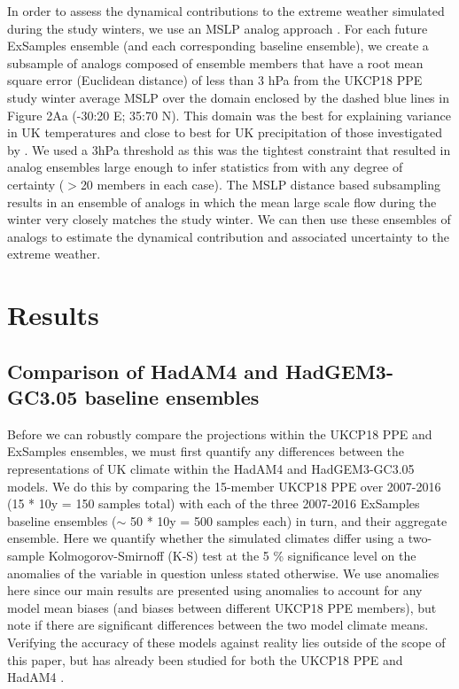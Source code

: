       In order to assess the dynamical contributions to the extreme weather simulated during the study winters, we use an MSLP analog approach \citep{cattiaux_winter_2010,vautard_attribution_2016,yiou_statistical_2017}. For each future ExSamples ensemble (and each corresponding baseline ensemble), we create a subsample of analogs composed of ensemble members that have a root mean square error (Euclidean distance) of less than 3 hPa from the UKCP18 PPE study winter average MSLP over the domain enclosed by the dashed blue lines in Figure 2Aa (-30:20\textdegree{} E; 35:70\textdegree{} N). This domain was the best for explaining variance in UK temperatures and close to best for UK precipitation of those investigated by \citep{neal_flexible_2016}. We used a 3hPa threshold as this was the tightest constraint that resulted in analog ensembles large enough to infer statistics from with any degree of certainty ($>$20 members in each case). The MSLP distance based subsampling results in an ensemble of analogs in which the mean large scale flow during the winter very closely matches the study winter. We can then use these ensembles of analogs to estimate the dynamical contribution and associated uncertainty to the extreme weather.

\section{Results}

  \subsection{Comparison of HadAM4 and HadGEM3-GC3.05 baseline ensembles}

    Before we can robustly compare the projections within the UKCP18 PPE and ExSamples ensembles, we must first quantify any differences between the representations of UK climate within the HadAM4 and HadGEM3-GC3.05 models. We do this by comparing the 15-member UKCP18 PPE over 2007-2016 (15 * 10y = 150 samples total) with each of the three 2007-2016 ExSamples baseline ensembles ($\sim$ 50 * 10y = 500 samples each) in turn, and their aggregate ensemble. Here we quantify whether the simulated climates differ using a two-sample Kolmogorov-Smirnoff (K-S) test \citep{hodges_significance_1958,kolmogorov_sulla_1933,smirnoff_estimation_1939,smirnoff_sur_1939} at the 5 \% significance level on the anomalies of the variable in question unless stated otherwise. We use anomalies here since our main results are presented using anomalies to account for any model mean biases (and biases between different UKCP18 PPE members), but note if there are significant differences between the two model climate means. Verifying the accuracy of these models against reality lies outside of the scope of this paper, but has already been studied for both the UKCP18 PPE \citep{murphy_ukcp18_2018} and HadAM4 \citep{bevacqua_larger_2021,watson_multi-thousand_2020}.
    
